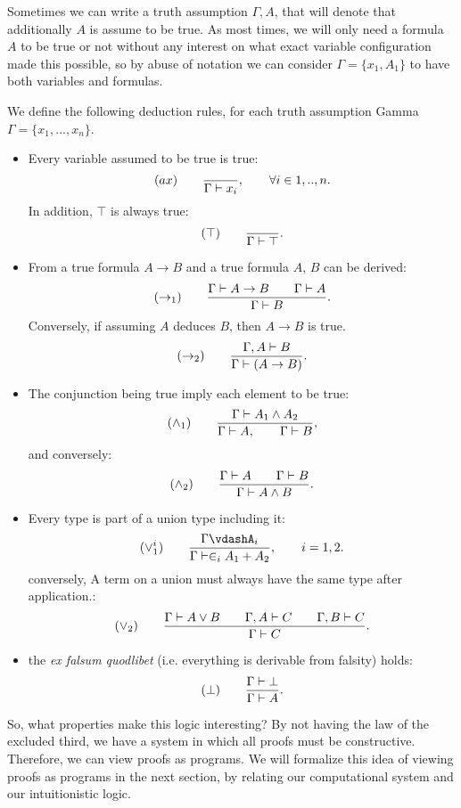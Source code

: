 Sometimes we can write a truth assumption $\Gamma, A$, that will denote that additionally $A$ is assume to be true. As most times, we will only need a formula $A$ to be true or not without any interest on what exact variable configuration made this possible, so by abuse of notation we can consider $\Gamma = \{x_1,A_1\}$ to have both variables and formulas.  
\begin{definition}
  We define the following deduction rules, for each truth assumption Gamma $\Gamma=\{x_1,...,x_n\}$.
  \begin{itemize}
    \item Every variable assumed to be true is true:
      $$  (ax)\qquad  {\displaystyle \over \Gamma \vdash x_i},\qquad \forall i \in 1,..,n.$$
      In addition, $\top$ is always true:
      $$  (\top)\qquad  {\displaystyle \over \Gamma \vdash \top}.$$
\item From a true formula $A\to B$ and a true formula $A$, $B$ can be derived:
  $$(\to_1)\qquad  {\displaystyle \Gamma \vdash A\to B\qquad \Gamma \vdash A      \over \Gamma \vdash B}.$$
  Conversely, if assuming $A$ deduces $B$, then $A\to B$ is true.
$$(\to_2)\qquad  {\displaystyle \Gamma, A \vdash B      \over \Gamma \vdash (A\to B)}.$$
  
\item The conjunction being true imply each element to be true:
  $$(\land_1) \qquad {\displaystyle \Gamma\vdash A_1\land A_2 \over \Gamma \vdash A, \qquad \Gamma \vdash B },$$
and conversely:
  $$(\land_2) \qquad {\displaystyle \Gamma\vdash A\qquad \Gamma\vdash B \over \Gamma \vdash  A \land B}.$$
\item Every type is part of a union type including it:
    $$  (\lor_1^i)\qquad  {\displaystyle\Gamma \vdashA_i \over \Gamma \vdash \in_i A_1+A_2},\qquad  i=  1,2.$$
  conversely, A term on a union must always have the same type after application.:
    $$(\lor_2) \qquad {\displaystyle \Gamma\vdash A\lor B\qquad \Gamma, A\vdash C\qquad \Gamma, B\vdash C \over \Gamma \vdash C}.$$
  \item the \emph{ex falsum quodlibet} (i.e. everything is derivable from falsity)  holds:
    $$  (\bot)\qquad  {\displaystyle\Gamma \vdash \bot \over \Gamma \vdash A}.$$ 

\end{itemize}
\end{definition}




So, what properties make this logic interesting? By not having the law of the excluded third, we have a system in which all proofs must be constructive. Therefore, we can view proofs as programs. We will formalize this idea of viewing proofs as programs in the next section, by relating our computational system and our intuitionistic logic. \\

